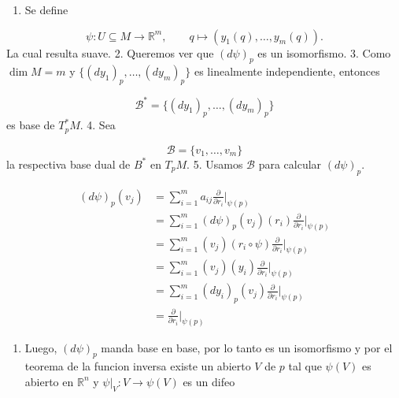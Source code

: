 \begin{bookproof}{}
\begin{enumerate}
\item Se define
\end{enumerate}
\[
\psi:U \subseteq M \to \mathbb R^m,\qquad q \mapsto (y_1(q),\ldots,y_m(q)).
\]
La cual resulta suave. 2. Queremos ver que $(d\psi)_p$ es un isomorfismo. 3. Como $\dim M=m$ y $\{(dy_1)_p,\ldots,(dy_m)_p\}$ es linealmente independiente, entonces

\[
\mathcal B^*=\{(dy_1)_p,\ldots,(dy_m)_p\}
\]
es base de $T_p^*M$. 4. Sea

\[
\mathcal B=\{v_1,\ldots,v_m\}
\]
la respectiva base dual de $B^{*}$ en $T_pM$. 5. Usamos $\mathcal B$ para calcular $(d\psi)_p$.

\[
\begin{aligned}(d\psi)_p(v_j)&=\sum_{i=1}^m a_{ij}\frac{\partial}{\partial r_i}\Big|_{\psi(p)}\\&=\sum_{i=1}^m (d\psi)_{p}(v_{j})(r_{i})\frac{\partial}{\partial r_i}\Big|_{\psi(p)}\\&=\sum_{i=1}^m (v_{j})(r_{i}\circ\psi)\frac{\partial}{\partial r_i}\Big|_{\psi(p)}\\&=\sum_{i=1}^m (v_{j})(y_{i})\frac{\partial}{\partial r_i}\Big|_{\psi(p)}\\&=\sum_{i=1}^m (dy_{i})_{p}(v_{j})\frac{\partial}{\partial r_i}\Big|_{\psi(p)}\\&=\frac{\partial}{\partial r_i}\Big|_{\psi(p)}\end{aligned}
\]
\begin{enumerate}[start=6]
\item Luego, $(d\psi)_p$ manda base en base, por lo tanto es un isomorfismo y por el teorema de la funcion inversa existe un abierto $V$ de $p$ tal que $\psi(V)$ es abierto en $\mathbb{R}^{n}$ y $\psi|_{V}:V\rightarrow\psi(V)$ es un difeo
\end{enumerate}
\bookqed
\end{bookproof}
\label{blk:2b23b2}
